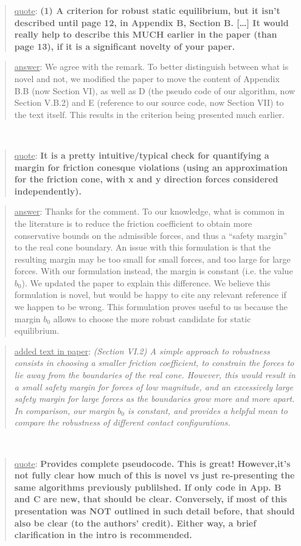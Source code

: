 \documentclass[a4paper]{article}
\newcommand{\done}[0]{}
\newcommand\quot[1]{\begin{quote} \underline{quote}: \textbf{#1}\end{quote}}
\newcommand\as[1]{\begin{quote} \underline{answer}: {#1}\end{quote} }
\newcommand\qt[1]{\begin{quote} \underline{added text in paper}: \textit{#1}\end{quote} \leavevmode \\ }
\newcommand\jp{ \leavevmode \\}
\begin{document}
\quot { (1) A criterion for robust static equilibrium, but it isn't
described until page 12, in Appendix B, Section B. [\dots]  It would really help to describe this MUCH earlier in
the paper (than page 13), if it is a significant novelty of your paper.}

\as{We agree with the remark. To better distinguish between what is novel and not, we modified the paper to move the content of Appendix B.B (now Section VI), as well as D  (the pseudo code of our algorithm, now Section V.B.2) and E (reference to our source code, now Section VII) to the text itself. This results in the criterion being presented much earlier.}\done \jp

\quot{It is a pretty intuitive/typical check for quantifying a
margin for friction conesque violations (using an approximation for
the friction cone, with x and y direction forces considered
independently). }

\as{Thanks for the comment. To our knowledge, what is common in the literature is to reduce the friction coefficient to obtain more conservative bounds on the admissible forces, and thus a ``safety margin'' to the real cone boundary. An issue with this formulation is that the resulting margin may be too small for small forces, and too large for large forces. With our formulation instead, the margin is constant (i.e. the value $b_0$). We updated the paper to explain this difference. We believe this formulation is novel, but would be happy to cite any relevant reference if we happen to be wrong. This formulation proves useful to us because the margin $b_0$ allows to choose the more robust candidate for static equilibrium. }\done
\qt{(Section VI.2) A simple approach to robustness consists in choosing a smaller friction coefficient, to constrain the forces to lie away from the boundaries of the real cone.  However, this would result in a small safety margin for forces of low magnitude, and an excessively large safety margin for large forces as the boundaries grow more and more apart. In comparison, our margin $b_0$ is constant, and provides a helpful mean to compare the robustness of different contact configurations.}


\quot{
Provides complete pseudocode.  This is great! However,it's
not fully clear how much of this is novel vs just re-presenting the
same algorithms previously publilshed.	If only code in App. B and C
are new, that should be clear. Conversely, if most of this presentation
was NOT outlined in such detail before, that should also be clear (to
the authors' credit). Either way, a brief clarification in the intro is
recommended.}
\end{document}
